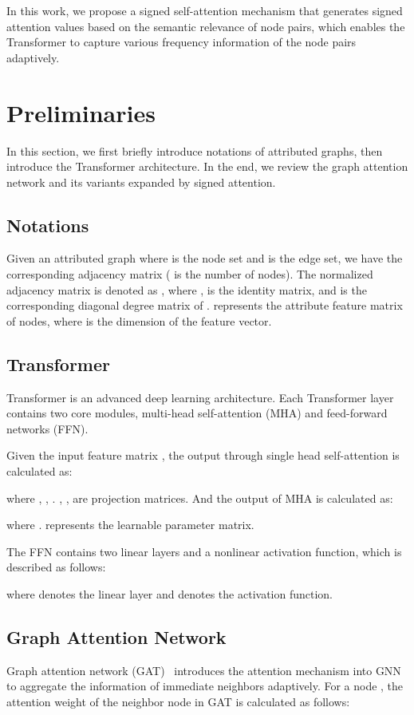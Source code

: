 \documentclass[sigconf, screen]{acmart}
\begin{document}
In this work, we propose a signed self-attention mechanism that generates signed attention values based on the semantic relevance of node pairs, which enables the Transformer to capture various frequency information of the node pairs adaptively.
 \section{Preliminaries}

In this section, we first briefly introduce notations of attributed graphs, then introduce the Transformer architecture. 
In the end, we review the graph attention network and its variants expanded by signed attention.

\subsection{Notations}
Given an attributed graph  where  is the node set and  is the edge set, 
we have the corresponding adjacency matrix  ( is the number of nodes).
The normalized adjacency matrix is denoted as  ,
where ,  is the identity matrix, and  is the corresponding diagonal degree matrix of .
 represents the attribute feature matrix of nodes, where  is the dimension of the feature vector.

\subsection{Transformer}
Transformer is an advanced deep learning architecture. 
Each Transformer layer contains two core modules, \ie multi-head self-attention (MHA) and feed-forward networks (FFN).

Given the input feature matrix , the output through single head self-attention is calculated as:

where , 
,
.
, 
,
 are projection matrices.
And the output of MHA is calculated as:

where .
 represents the learnable parameter matrix.

The FFN contains two linear layers and a nonlinear activation function, which is described as follows:

where  denotes the linear layer and  denotes the activation function.

\subsection{Graph Attention Network}\label{sgat}
Graph attention network (GAT)~\cite{gat} introduces the attention mechanism into GNN to aggregate the information of immediate neighbors adaptively.
For a node , the attention weight of the neighbor node  in GAT is calculated as follows:
\end{document}
